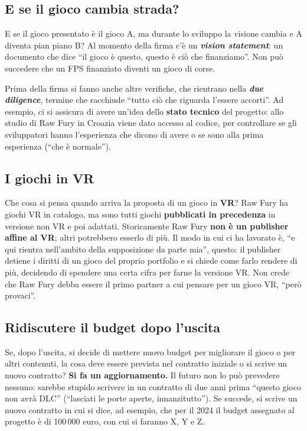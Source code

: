 \subsection{E se il gioco cambia strada?}

E se il gioco presentato è il gioco A, ma durante lo sviluppo la visione cambia
e A diventa pian piano B? Al momento della firma c'è un \textbf{\emph{vision
statement}}: un documento che dice ``il gioco è questo, questo è ciò che
finanziamo''. Non può succedere che un FPS finanziato diventi un gioco di corse.

Prima della firma si fanno anche altre verifiche, che rientrano nella
\textbf{\emph{due diligence}}, termine che racchiude ``tutto ciò che riguarda
l'essere accorti''. Ad esempio, ci si assicura di avere un'idea dello
\textbf{stato tecnico} del progetto: allo studio di Raw Fury in Croazia viene
dato accesso al codice, per controllare se gli sviluppatori hanno l'esperienza
che dicono di avere o se sono alla prima esperienza (``che è normale'').

\subsection{I giochi in VR}

Che cosa si pensa quando arriva la proposta di un gioco in \textbf{VR}? Raw
Fury ha giochi VR in catalogo, ma sono tutti giochi \textbf{pubblicati in
precedenza} in versione non VR e poi adattati. Storicamente Raw Fury \textbf{non
è un publisher affine al VR}; altri potrebbero esserlo di più. Il modo in cui ci
ha lavorato è, ``e qui rientra nell'ambito della supposizione da parte mia'',
questo: il publisher detiene i diritti di un gioco del proprio portfolio e si
chiede come farlo rendere di più, decidendo di spendere una certa cifra per
farne la versione VR. Non crede che Raw Fury debba essere il primo partner a cui
pensare per un gioco VR, ``però provaci''.

\subsection{Ridiscutere il budget dopo l'uscita}

Se, dopo l'uscita, si decide di mettere nuovo budget per migliorare il gioco o
per altri contenuti, la cosa deve essere prevista nel contratto iniziale o si
scrive un nuovo contratto? \textbf{Si fa un aggiornamento.} Il futuro non lo può
prevedere nessuno: sarebbe stupido scrivere in un contratto di due anni prima
``questo gioco non avrà DLC'' (``lasciati le porte aperte, innanzitutto''). Se
succede, si scrive un nuovo contratto in cui si dice, ad esempio, che per il
2024 il budget assegnato al progetto è di 100\,000 euro, con cui si faranno X, Y
e Z.

